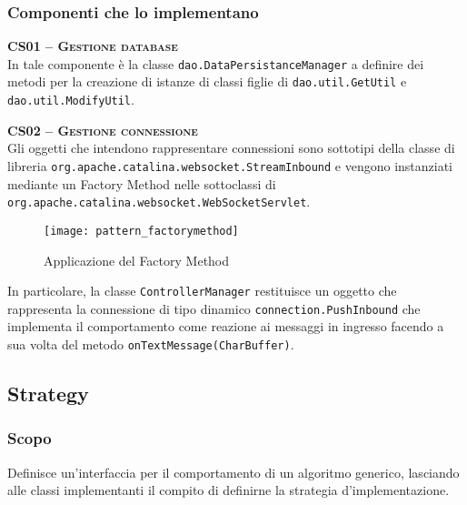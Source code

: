\subsubsection{Componenti che lo implementano}
\begin{description}

	\item{\scshape\bfseries CS01 -- Gestione database}\\
In tale componente è la classe \texttt{dao.DataPersistanceManager} a definire dei metodi per la creazione di istanze di classi figlie di \texttt{dao.util.GetUtil} e \texttt{dao.util.ModifyUtil}.

  \item{\scshape\bfseries CS02 -- Gestione connessione}\\
Gli oggetti che intendono rappresentare connessioni sono sottotipi della classe di libreria \texttt{org.apache.catalina.websocket.StreamInbound} e vengono instanziati mediante un Factory Method nelle sottoclassi di \texttt{org.apache.catalina.websocket.WebSocketServlet}.

\begin{figure}[H]
  \centering
  \texttt{[image: pattern\_factorymethod]}
  \caption{Applicazione del  Factory Method}\label{fig:factory_method}
\end{figure}

In particolare, la classe \texttt{ControllerManager} restituisce un oggetto che rappresenta la connessione di tipo dinamico \texttt{connection.PushInbound} che implementa il comportamento come reazione ai messaggi in ingresso facendo a sua volta  del metodo \texttt{onTextMessage(CharBuffer)}.

\end{description}

\subsection{Strategy}\label{sec:patternstrategy}

\subsubsection{Scopo}
Definisce un'interfaccia per il comportamento di un algoritmo generico, lasciando alle classi implementanti il compito di definirne la strategia d'implementazione.

